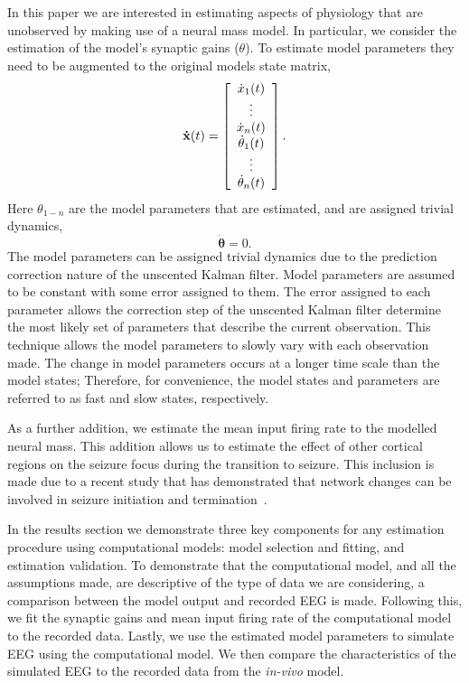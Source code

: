 
In this paper we are interested in estimating aspects of physiology that are unobserved by making use of a neural mass model. In particular, we consider the estimation of the model's synaptic gains ($\theta$). To estimate model parameters they need to be augmented to the original models state matrix, 
\[ \mathbf{\dot{x}}(t) = \left[ \begin{array}[pos]{c}
\dot{x}_{1}(t)\\
\vdots \\
\dot{x}_{n}(t)\\
\dot{\theta}_{1}(t)\\
\vdots\\
\dot{\theta}_{n}(t) \end{array} \right] .\] Here $\theta_{1-n}$ are the model parameters that are estimated, and are assigned trivial dynamics,
\begin{equation}\label{eq: ParameterDyn}
 \mathbf{\dot{\theta}}=0.
\end{equation}
The model parameters can be assigned trivial dynamics due to the prediction correction nature of the unscented Kalman filter. Model parameters are assumed to be constant with some error assigned to them. The error assigned to each parameter allows the correction step of the unscented Kalman filter determine the most likely set of parameters that describe the current observation. This technique allows the model parameters to slowly vary with each observation made. The change in model parameters occurs at a longer time scale than the model states; Therefore, for convenience, the model states and parameters are referred to as fast and slow states, respectively. 

As a further addition, we estimate the mean input firing rate to the modelled neural mass. This addition allows us to estimate the effect of other cortical regions on the seizure focus during the transition to seizure. This inclusion is made due to a recent study that has demonstrated that network changes can be involved in seizure initiation and termination~\citep{truccolo2011single}. 

In the results section we demonstrate three key components for any estimation procedure using computational models: model selection and fitting, and estimation validation. To demonstrate that the computational model, and all the assumptions made, are descriptive of the type of data we are considering, a comparison between the model output and recorded EEG is made. Following this, we fit the synaptic gains and mean input firing rate of the computational model to the recorded data. Lastly, we use the estimated model parameters to simulate EEG using the computational model. We then compare the characteristics of the simulated EEG to the recorded data from the \textsl{in-vivo} model.
